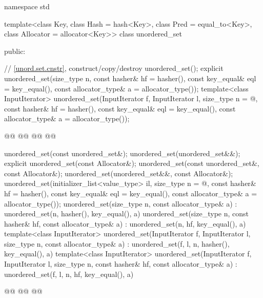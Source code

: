 \documentclass{wg21}
\begin{document}
%
\begin{codeblock}
namespace std {
template<class Key,
class Hash = hash<Key>,
class Pred = equal_to<Key>,
class Allocator = allocator<Key>>
class unordered_set {
    public:

    // \ref{unord.set.cnstr}, construct/copy/destroy
    unordered_set();
    explicit unordered_set(size_type n,
    const hasher& hf = hasher(),
    const key_equal& eql = key_equal(),
    const allocator_type& a = allocator_type());
    template<class InputIterator>
    unordered_set(InputIterator f, InputIterator l,
        size_type n = @\seebelow@,
        const hasher& hf = hasher(),
        const key_equal& eql = key_equal(),
        const allocator_type& a = allocator_type());

    @@
    @@
    @@
    @@

    unordered_set(const unordered_set&);
    unordered_set(unordered_set&&);
    explicit unordered_set(const Allocator&);
    unordered_set(const unordered_set&, const Allocator&);
    unordered_set(unordered_set&&, const Allocator&);
    unordered_set(initializer_list<value_type> il,
        size_type n = @\seebelow@,
        const hasher& hf = hasher(),
        const key_equal& eql = key_equal(),
        const allocator_type& a = allocator_type());
    unordered_set(size_type n, const allocator_type& a)
    : unordered_set(n, hasher(), key_equal(), a) { }
    unordered_set(size_type n, const hasher& hf, const allocator_type& a)
    : unordered_set(n, hf, key_equal(), a) { }
    template<class InputIterator>
    unordered_set(InputIterator f, InputIterator l, size_type n, const allocator_type& a)
    : unordered_set(f, l, n, hasher(), key_equal(), a) { }
    template<class InputIterator>
    unordered_set(InputIterator f, InputIterator l, size_type n, const hasher& hf,
        const allocator_type& a)
    : unordered_set(f, l, n, hf, key_equal(), a) { }

    @@
    @@
    @@

}}
\end{codeblock}
\end{document}
